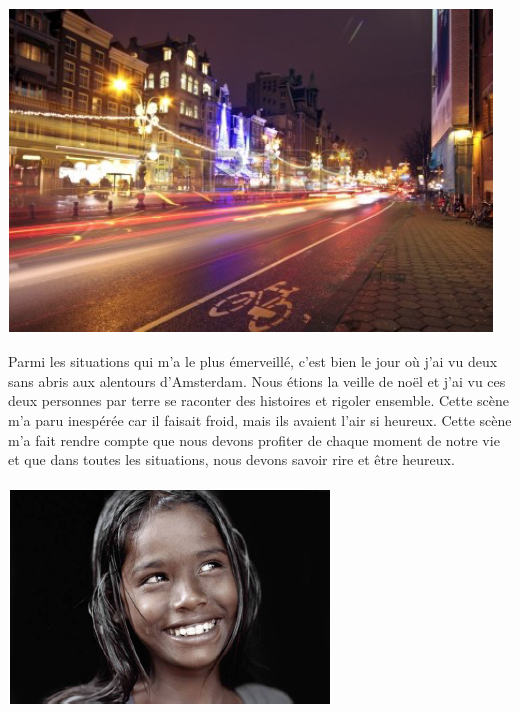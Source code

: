 \paragraph{}
\begin{center}
\includegraphics[scale=0.7]{Amsterdam1.jpg}
\end{center}

Parmi les situations qui m'a le plus émerveillé, c'est bien le jour où j'ai vu
deux sans abris aux alentours d'Amsterdam.  Nous étions la veille de noël et
j'ai vu ces deux personnes par terre se raconter des histoires et rigoler
ensemble. Cette scène m'a paru inespérée car il faisait froid, mais ils avaient
l'air si heureux.  Cette scène m'a fait rendre compte que nous devons profiter
de chaque moment de notre vie et que dans toutes les situations, nous devons
savoir rire et être heureux.

\paragraph{}
\begin{center}
\includegraphics[scale=0.7]{Amsterdam2.jpg}
\end{center}

